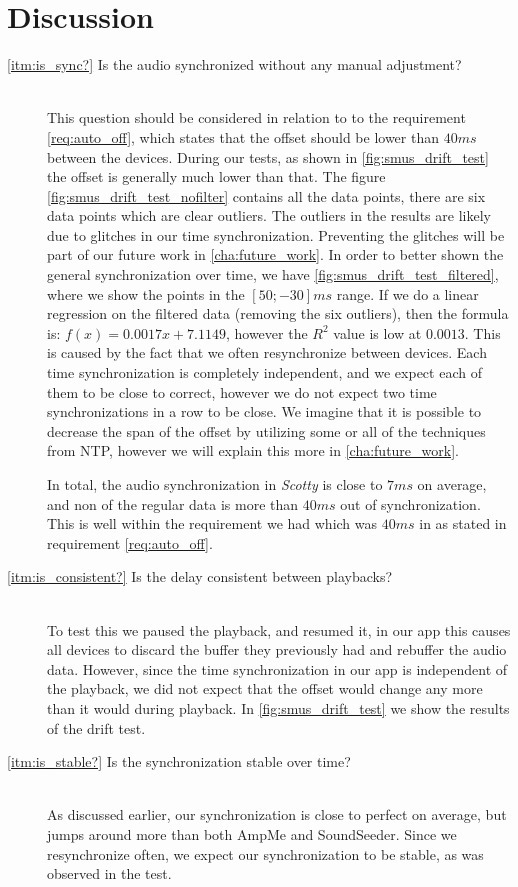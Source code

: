 \section{Discussion}
\begin{description}
    \item[\ref{itm:is_sync?} Is the audio synchronized without any manual adjustment?] \hfill \\
        This question should be considered in relation to to the requirement \vref{req:auto_off}, which states that the offset should be lower than $40 ms$ between the devices.
        During our tests, as shown in \vref{fig:smus_drift_test} the offset is generally much lower than that.
        The figure \vref{fig:smus_drift_test_nofilter} contains all the data points, there are six data points which are clear outliers.
        The outliers in the results are likely due to glitches in our time synchronization.
        Preventing the glitches will be part of our future work in \vref{cha:future_work}.
        In order to better shown the general synchronization over time, we have \vref{fig:smus_drift_test_filtered}, where we show the points in the $[50;-30] ms$ range.
        If we do a linear regression on the filtered data (removing the six outliers), then the formula is: $f(x) = 0.0017x + 7.1149$, however the $R^2$ value is low at $0.0013$.
        This is caused by the fact that we often resynchronize between devices.
        Each time synchronization is completely independent, and we expect each of them to be close to correct, however we do not expect two time synchronizations in a row to be close.
        We imagine that it is possible to decrease the span of the offset by utilizing some or all of the techniques from \ac{NTP}, however we will explain this more in \vref{cha:future_work}.

        In total, the audio synchronization in \textit{Scotty} is close to $7 ms$ on average, and non of the regular data is more than $40 ms$ out of synchronization.
        This is well within the requirement we had which was $40 ms$ in as stated in requirement \ref{req:auto_off}.

    \item[\ref{itm:is_consistent?} Is the delay consistent between playbacks?] \hfill \\
        To test this we paused the playback, and resumed it, in our app this causes all devices to discard the buffer they previously had and rebuffer the audio data.
        However, since the time synchronization in our app is independent of the playback, we did not expect that the offset would change any more than it would during playback.
        In \vref{fig:smus_drift_test} we show the results of the drift test.

    \item[\ref{itm:is_stable?} Is the synchronization stable over time?] \hfill \\
        As discussed earlier, our synchronization is close to perfect on average, but jumps around more than both AmpMe and SoundSeeder.
        Since we resynchronize often, we expect our synchronization to be stable, as was observed in the test.
\end{description}
